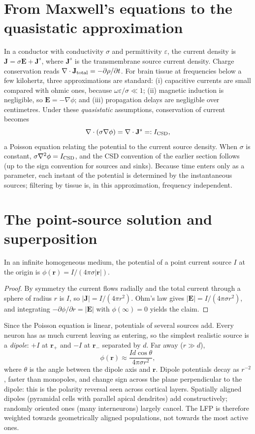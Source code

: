 \section{From Maxwell's equations to the quasistatic approximation}
In a conductor with conductivity $\sigma$ and permittivity $\varepsilon$, the current density is $\mathbf J=\sigma\mathbf E+\mathbf J^s$, where $\mathbf J^s$ is the transmembrane source current density. Charge conservation reads $\nabla\cdot\mathbf J_{\rm total}=-\partial\rho/\partial t$. For brain tissue at frequencies below a few kilohertz, three approximations are standard: (i) capacitive currents are small compared with ohmic ones, because $\omega\varepsilon/\sigma\ll1$; (ii) magnetic induction is negligible, so $\mathbf E=-\nabla\phi$; and (iii) propagation delays are negligible over centimetres. Under these \emph{quasistatic} assumptions, conservation of current becomes
\[
\nabla\cdot(\sigma\nabla\phi)=\nabla\cdot\mathbf J^s=:I_{\rm CSD},
\]
a Poisson equation relating the potential to the current source density. When $\sigma$ is constant, $\sigma\nabla^2\phi=I_{\rm CSD}$, and the CSD convention of the earlier section follows (up to the sign convention for sources and sinks). Because time enters only as a parameter, each instant of the potential is determined by the instantaneous sources; filtering by tissue is, in this approximation, frequency independent.

\section{The point-source solution and superposition}
\begin{proposition}
In an infinite homogeneous medium, the potential of a point current source $I$ at the origin is $\phi(\mathbf r)=I/(4\pi\sigma|\mathbf r|)$.
\end{proposition}
\begin{proof}
By symmetry the current flows radially and the total current through a sphere of radius $r$ is $I$, so $|\mathbf J|=I/(4\pi r^2)$. Ohm's law gives $|\mathbf E|=I/(4\pi\sigma r^2)$, and integrating $-\partial\phi/\partial r=|\mathbf E|$ with $\phi(\infty)=0$ yields the claim.
\end{proof}
Since the Poisson equation is linear, potentials of several sources add. Every neuron has as much current leaving as entering, so the simplest realistic source is a \emph{dipole}: $+I$ at $\mathbf r_+$ and $-I$ at $\mathbf r_-$ separated by $d$. Far away ($r\gg d$),
\[
\phi(\mathbf r)\approx\frac{I d\cos\theta}{4\pi\sigma r^2},
\]
where $\theta$ is the angle between the dipole axis and $\mathbf r$. Dipole potentials decay as $r^{-2}$, faster than monopoles, and change sign across the plane perpendicular to the dipole: this is the polarity reversal seen across cortical layers. Spatially aligned dipoles (pyramidal cells with parallel apical dendrites) add constructively; randomly oriented ones (many interneurons) largely cancel. The LFP is therefore weighted towards geometrically aligned populations, not towards the most active ones.

